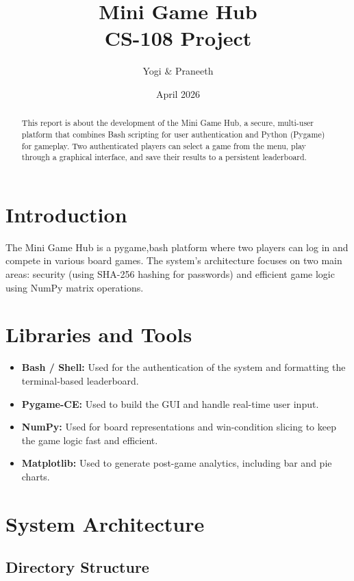 \documentclass[10pt]{article}
\title{Mini Game Hub\\ CS-108 Project}
\author{Yogi \& Praneeth}
\date{April 2026}
\begin{document}
    \maketitle
    \begin{abstract}
    This report is about the development of the Mini Game Hub, a secure, multi-user platform that combines Bash scripting for user authentication and Python (Pygame) for gameplay. Two authenticated players can select a game from the menu, play through a graphical interface, and save their results to a persistent leaderboard. 
    \end{abstract}

    \tableofcontents
    \newpage

    \section{Introduction}
    The Mini Game Hub is a pygame,bash platform where two players can log in and compete in various board games. The system's architecture focuses on two main areas: security (using SHA-256 hashing for passwords) and efficient game logic using NumPy matrix operations.

    \section{Libraries and Tools}
    \begin{itemize}
        \item \textbf{Bash / Shell:} Used for the authentication of the system and formatting the terminal-based leaderboard.
        \item \textbf{Pygame-CE:} Used to build the GUI and handle real-time user input.
        \item \textbf{NumPy:} Used for board representations and win-condition slicing to keep the game logic fast and efficient.
        \item \textbf{Matplotlib:} Used to generate post-game analytics, including bar and pie charts.
    \end{itemize}

    \section{System Architecture}
    \subsection{Directory Structure}
\end{document}
